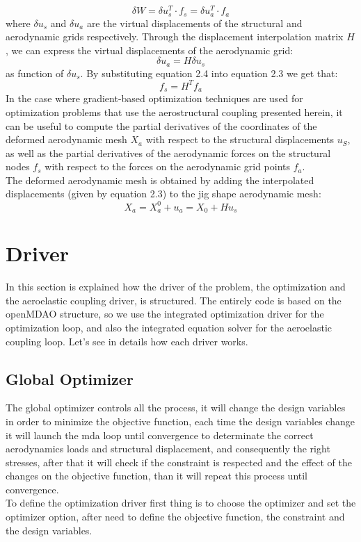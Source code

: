 \begin{equation}
	\delta W = \delta u_s^T \cdot f_s = \delta u_a^T \cdot f_a
\end{equation}
where $\delta u_s$ and $\delta u_a$ are the virtual displacements of the structural and aerodynamic grids respectively. Through the displacement interpolation matrix $H$, we can express the virtual displacements of the aerodynamic grid:
\begin{equation}
\delta u_a=H\delta u_s
\end{equation}
as function of $\delta u_s$. By substituting equation 2.4 into equation 2.3 we get that:
\begin{equation}
	f_s=H^T f_a
\end{equation}
In the case where gradient-based optimization techniques are used for optimization problems that use the aerostructural coupling presented herein, it can be useful to compute the partial derivatives of the coordinates of the deformed aerodynamic mesh $X_a$ with respect to the structural displacements $u_S$, as well as the partial derivatives of the aerodynamic forces on the structural nodes $f_s$ with respect to the forces on the aerodynamic grid points $f_a$.\cite{joan}\\
The deformed aerodynamic mesh is obtained by adding the interpolated displacements (given by equation 2.3) to the jig shape aerodynamic mesh:
\begin{equation}
	X_a=X_a^0+u_a=X_0+Hu_s
\end{equation}
\section{Driver}
In this section is explained how the driver of the problem, the optimization and the aeroelastic coupling driver, is structured. The entirely code is based on the openMDAO structure, so we use  the integrated optimization driver for the optimization loop, and also the integrated equation solver for the aeroelastic coupling loop. Let's see in details how each driver works.
\subsection{Global Optimizer}
The global optimizer controls all the process, it will change the design variables in order to minimize the objective function, each time the design variables change it will launch the mda loop until convergence to determinate the correct aerodynamics loads and structural displacement, and consequently the right stresses, after that it will check if the constraint is respected and the effect of the changes on the objective function, than it will repeat this process until convergence. \\
To define the optimization driver first thing is to choose the optimizer and set the optimizer option, after need to define the objective function, the constraint and the design variables.
